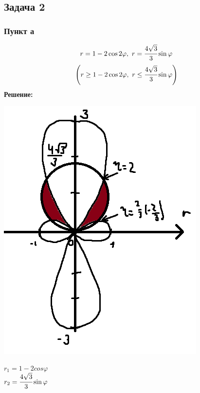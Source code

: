 \subsection*{Задача 2}
\subsubsection*{Пункт а}
$$r = 1 - 2 \cos 2 \varphi, ~ r = \cfrac{4 \sqrt{3}}{3} \sin \varphi$$
$$\left(r \geq 1 - 2 \cos 2 \varphi, ~ r \leq \cfrac{4 \sqrt{3}}{3} \sin \varphi \right)$$
\textbf{Решение:}


\begin{minipage}{0.3\textwidth}
\includegraphics[width=\linewidth]{pics/pic1.png}
\end{minipage}
\hfill
\begin{minipage}{0.6\textwidth}\raggedleft
$r_1 = 1-2cos\varphi$ \\
$r_2 = \cfrac{4 \sqrt{3}}{3} \sin \varphi$
\end{minipage}

